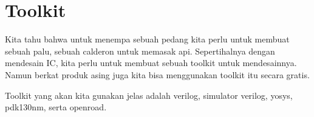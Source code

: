 \chapter{Toolkit}
Kita tahu bahwa untuk menempa sebuah pedang kita perlu untuk membuat sebuah palu, sebuah calderon untuk memasak api. Sepertihalnya dengan mendesain IC, kita perlu untuk membuat sebuah toolkit untuk mendesainnya. Namun berkat produk asing juga kita bisa menggunakan toolkit itu secara gratis. 

Toolkit yang akan kita gunakan jelas adalah verilog, simulator verilog, yosys, pdk130nm, serta openroad.